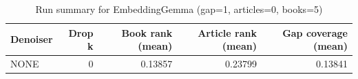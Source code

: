 \begin{table}
\caption{Run summary for EmbeddingGemma (gap=1, articles=0, books=5)}
\label{tab:summary_gap1_embeddinggemma_a0_b5}
\begin{tabular}{lrrrr}
\toprule
Denoiser & Drop k & Book rank (mean) & Article rank (mean) & Gap coverage (mean) \\
\midrule
NONE & 0 & 0.13857 & 0.23799 & 0.13841 \\
\bottomrule
\end{tabular}
\end{table}